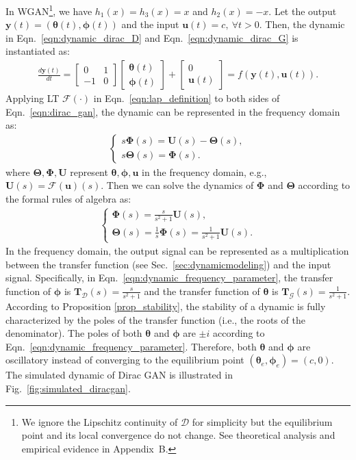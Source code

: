 \documentclass{article}
\newcommand{\xG}{\mathcal{G}}
\newcommand{\xD}{\mathcal{D}}
\newcommand{\ty}{\bm{y}}
\newcommand{\tu}{\bm{u}}
\newcommand{\ttheta}{\bm{\theta}}
\newcommand{\tphi}{\bm{\phi}}
\newcommand{\fU}{\bm{U}}
\newcommand{\fT}{\bm{T}}
\newcommand{\fTheta}{\bm{\Theta}}
\newcommand{\fPhi}{\bm{\Phi}}
\newcommand{\fig}[1]{Fig.~\ref{fig:#1}}
\newcommand{\eqn}[1]{Eqn.~\eqref{eqn:#1}}
\newcommand{\secref}[1]{Sec.~\ref{sec:#1}} \usepackage{wrapfig}
\theoremstyle{definition}
\begin{document}
In WGAN\footnote{We ignore the Lipschitz continuity of $\xD$ for simplicity but the equilibrium point and its local convergence do not change. See theoretical analysis and empirical evidence in Appendix~B.}, we have $h_1(x) = h_3(x) = x$ and $h_2(x) = -x$. Let the output $\ty(t)=(\ttheta(t), \tphi(t))$ and the input $\tu(t) = c,~\forall t > 0$. Then, the dynamic in \eqn{dynamic_dirac_D} and \eqn{dynamic_dirac_G} is instantiated as:
\begin{align}
\frac{d\ty(t)}{dt} = \begin{bmatrix}0 & 1 \\ -1 & 0 \end{bmatrix}\begin{bmatrix}\ttheta(t) \\ \tphi(t) \end{bmatrix} + \begin{bmatrix}0 \\ \tu(t)\end{bmatrix} = f(\ty(t), \tu(t)). \label{eqn:dirac_gan}
\end{align}
Applying LT $\mathcal{F}(\cdot)$ in \eqn{lap_definition} to both sides of \eqn{dirac_gan}, the dynamic can be represented in the frequency domain as:
\begin{align}
\begin{cases}
s\fPhi(s) = \fU(s) - \fTheta(s),\\
s\fTheta(s) = \fPhi(s).
\end{cases}
\label{eqn:dynamic_diracgan_lap}
\end{align}
where $\fTheta, \fPhi, \fU$ represent $\ttheta, \tphi, \tu$ in the frequency domain, e.g., $\fU(s) = \mathcal{F}(\tu)(s)$.
Then we can solve the dynamics of $\fPhi$ and $\fTheta$ according to the formal rules of algebra as:
\begin{align}
\begin{cases}
\fPhi(s) = \frac{s}{s^2 + 1}\fU(s), \\
\fTheta(s) = \frac{1}{s}\fPhi(s) = \frac{1}{s^2 + 1}\fU(s).
\end{cases}\label{eqn:dynamic_frequency_parameter}
\end{align}
In the frequency domain, the output signal can be represented as a multiplication between the transfer function (see \secref{dynamicmodeling}) and the input signal.
Specifically, in \eqn{dynamic_frequency_parameter}, the transfer function of $\tphi$ is $\fT_\xD(s) = \frac{s}{s^2 + 1}$ and the transfer function of $\ttheta$ is $\fT_\xG(s) = \frac{1}{s^2+1}$.
According to Proposition \ref{prop_stability}, the stability of a dynamic is fully characterized by the poles of the transfer function (i.e., the roots of the denominator).
The poles of both $\ttheta$ and $\tphi$ are $\pm i$ according to \eqn{dynamic_frequency_parameter}. Therefore, both $\ttheta$ and $\tphi$ are oscillatory instead of converging to the equilibrium point $(\ttheta_e, \tphi_e) = (c, 0)$. The simulated dynamic of Dirac GAN is illustrated in \fig{simulated_diracgan}. 
\end{document}

